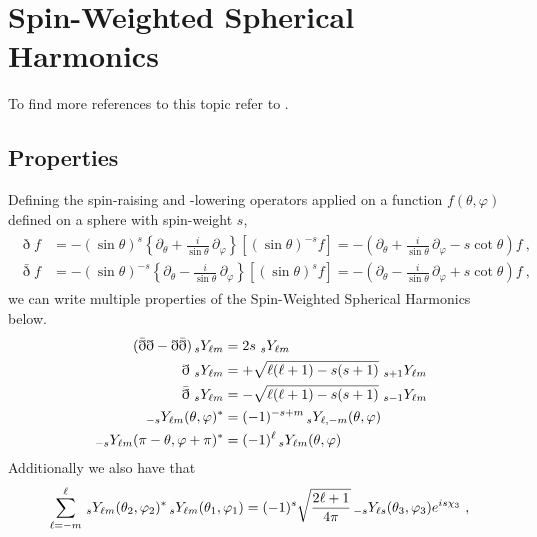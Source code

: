 
\section{Spin-Weighted Spherical Harmonics}
\label{AppendixA}

To find more references to this topic refer to \cite{TorresdelCastillo2003}.

\subsection{Properties}

Defining the spin-raising and -lowering operators applied on a function $f(\theta,\varphi)$ defined on a sphere with spin-weight $s$, 
\begin{align}
	\begin{split}
		\eth f &= - (\sin{\theta})^s \left\{ \partial_\theta + \frac{i}{\sin{\theta}} \, \partial_\varphi \right\} \left[ (\sin{\theta})^{-s} f \right] 
		= - \left( \partial_\theta + \frac{i}{\sin{\theta}} \, \partial_\varphi - s \cot\theta \right) f ~, \\
		\bar{\eth} f &= - (\sin{\theta})^{-s} \left\{ \partial_\theta - \frac{i}{\sin{\theta}} \, \partial_\varphi \right\} \left[ (\sin{\theta})^{s} f \right]
		= - \left( \partial_\theta - \frac{i}{\sin{\theta}} \, \partial_\varphi + s \cot\theta \right) f ~,
    \end{split}
\end{align}
we can write multiple properties of the Spin-Weighted Spherical Harmonics below.
\begin{subequations}
    \begin{align}
        (\bar\eth \eth - \eth \bar{\eth} ) \uu[s]{Y}{\ell m} &= 2 s \,\uu[s]{Y}{\ell m} \\
        \eth \,\uu[s]{Y}{\ell m} &= +\sqrt{\ell(\ell+1)-s(s+1)} \,\uu[s+1]{Y}{\ell m} \\
        \bar\eth \,\uu[s]{Y}{\ell m} &= -\sqrt{\ell(\ell+1)-s(s+1)} \,\uu[s-1]{Y}{\ell m} \\
        \uu[-s]{Y}{\ell m}(\theta,\varphi)^* &= (-1)^{-s+m} \uu[s]{Y}{\ell, -m}(\theta,\varphi) \\
        \uu[-s]{Y}{\ell m}(\pi-\theta,\varphi+\pi)^* &= (-1)^{\ell} \uu[s]{Y}{\ell m}(\theta,\varphi)
    \end{align}
\end{subequations}
Additionally we also have that
\begin{subequations}[resume]
    \begin{align}
        \sum_{\ell=-m}^\ell \uu[s]{Y}{\ell m}(\theta_2,\varphi_2)^* \uu[s]{Y}{\ell m}(\theta_1,\varphi_1) = (-1)^s \sqrt{\frac{2 \ell +1 }{4 \pi}} \uu[-s]{Y}{\ell s}(\theta_3,\varphi_3) e^{i s \chi_3} ~,
    \end{align}
\end{subequations}
